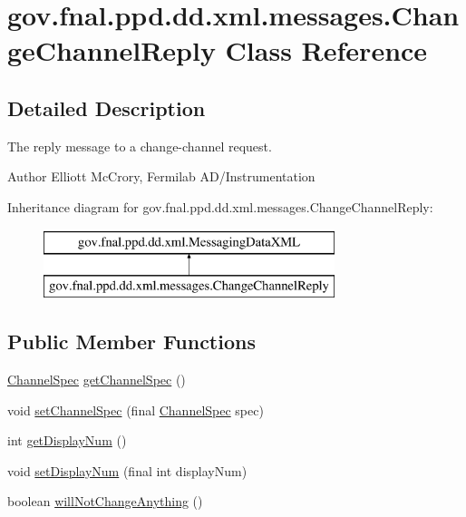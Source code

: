 \hypertarget{classgov_1_1fnal_1_1ppd_1_1dd_1_1xml_1_1messages_1_1ChangeChannelReply}{\section{gov.\-fnal.\-ppd.\-dd.\-xml.\-messages.\-Change\-Channel\-Reply Class Reference}
\label{classgov_1_1fnal_1_1ppd_1_1dd_1_1xml_1_1messages_1_1ChangeChannelReply}
}


\subsection{Detailed Description}
The reply message to a change-\/channel request.

\begin{DoxyAuthor}{Author}
Elliott Mc\-Crory, Fermilab A\-D/\-Instrumentation 
\end{DoxyAuthor}
Inheritance diagram for gov.\-fnal.\-ppd.\-dd.\-xml.\-messages.\-Change\-Channel\-Reply\-:\begin{figure}[H]
\begin{center}
\leavevmode
\includegraphics[height=2.000000cm]{classgov_1_1fnal_1_1ppd_1_1dd_1_1xml_1_1messages_1_1ChangeChannelReply}
\end{center}
\end{figure}
\subsection*{Public Member Functions}
\begin{DoxyCompactItemize}
\item 
\hyperlink{classgov_1_1fnal_1_1ppd_1_1dd_1_1xml_1_1ChannelSpec}{Channel\-Spec} \hyperlink{classgov_1_1fnal_1_1ppd_1_1dd_1_1xml_1_1messages_1_1ChangeChannelReply_a2148d067969233f3f58b5c5f24dfef5d}{get\-Channel\-Spec} ()
\item 
void \hyperlink{classgov_1_1fnal_1_1ppd_1_1dd_1_1xml_1_1messages_1_1ChangeChannelReply_a7d44da591c536ef713b7da33684c9e2c}{set\-Channel\-Spec} (final \hyperlink{classgov_1_1fnal_1_1ppd_1_1dd_1_1xml_1_1ChannelSpec}{Channel\-Spec} spec)
\item 
int \hyperlink{classgov_1_1fnal_1_1ppd_1_1dd_1_1xml_1_1messages_1_1ChangeChannelReply_a3fe315759677642f71643776a0ae8e61}{get\-Display\-Num} ()
\item 
void \hyperlink{classgov_1_1fnal_1_1ppd_1_1dd_1_1xml_1_1messages_1_1ChangeChannelReply_a07acaf38256ba11733e5edc51c3559ea}{set\-Display\-Num} (final int display\-Num)
\item 
boolean \hyperlink{classgov_1_1fnal_1_1ppd_1_1dd_1_1xml_1_1messages_1_1ChangeChannelReply_ac7d11eba4eae1008866013dd26c9f998}{will\-Not\-Change\-Anything} ()
\end{DoxyCompactItemize}


